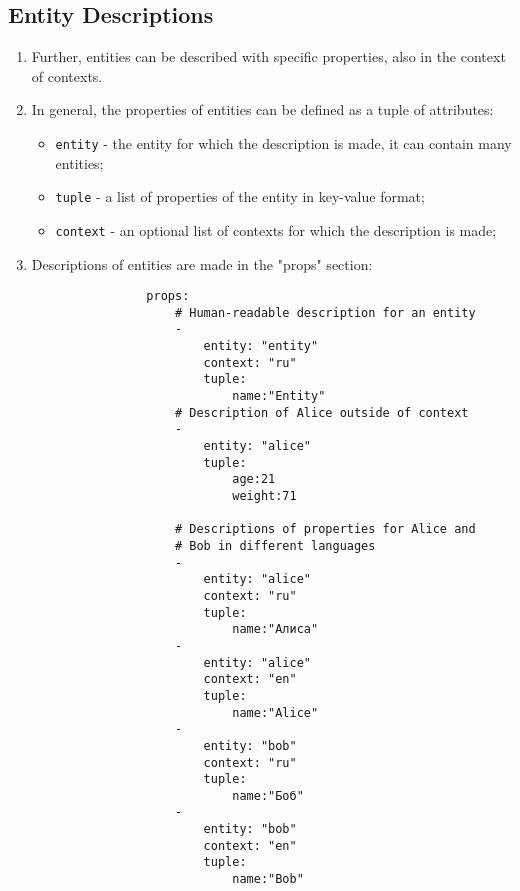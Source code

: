 \documentclass[final]{article}
\begin{document}
        \subsection{Entity Descriptions}
            \begin{enumerate}

                \item Further, entities can be described with specific 
                properties, also in the context of contexts.

                \item In general, the properties of entities can be defined as a 
                tuple of attributes:

                \begin{itemize}

                    \item \texttt{entity} - the entity for which the description 
                    is made, it can contain many entities;

                    \item \texttt{tuple} - a list of properties of the entity in 
                    key-value format;

                    \item \texttt{context} - an optional list of contexts for 
                    which the description is made;

                \end{itemize}

                \item Descriptions of entities are made in the "props" section:

                \begin{verbatim}
                props:
                    # Human-readable description for an entity
                    -
                        entity: "entity"
                        context: "ru"
                        tuple:
                            name:"Entity"
                    # Description of Alice outside of context
                    -
                        entity: "alice"
                        tuple:
                            age:21
                            weight:71

                    # Descriptions of properties for Alice and 
                    # Bob in different languages
                    -
                        entity: "alice"
                        context: "ru"
                        tuple:
                            name:"Алиса"
                    -
                        entity: "alice"
                        context: "en"
                        tuple:
                            name:"Alice"
                    -
                        entity: "bob"
                        context: "ru"
                        tuple:
                            name:"Боб"
                    -
                        entity: "bob"
                        context: "en"
                        tuple:
                            name:"Bob"


\end{verbatim}
\end{enumerate}
\end{document}
